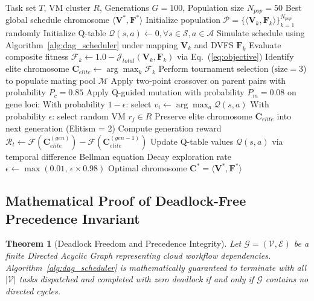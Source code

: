 \documentclass[default,sn-mathphys-num]{sn-jnl}
\theoremstyle{thmstyleone}
\newtheorem{theorem}{Theorem}
\theoremstyle{thmstyletwo}
\theoremstyle{thmstylethree}
\begin{document}
\begin{algorithm}[t]
\caption{Co-Evolutionary RL-GA Multi-Objective Optimization Core}\label{alg:co_evol}
\begin{algorithmic}[1]
\Require Task set $T$, VM cluster $R$, Generations $G=100$, Population size $N_{pop}=50$
\Ensure Best global schedule chromosome $\langle \mathbf{V}^*, \mathbf{F}^* \rangle$
\State Initialize population $\mathcal{P} = \{\langle \mathbf{V}_k, \mathbf{F}_k \rangle\}_{k=1}^{N_{pop}}$ randomly
\State Initialize Q-table $\mathcal{Q}(s, a) \gets 0, \forall s \in \mathcal{S}, a \in \mathcal{A}$
        \State Simulate schedule using Algorithm~\ref{alg:dag_scheduler} under mapping $\mathbf{V}_k$ and DVFS $\mathbf{F}_k$
        \State Evaluate composite fitness $\mathcal{F}_k \gets 1.0 - \mathcal{J}_{total}(\mathbf{V}_k, \mathbf{F}_k)$ via Eq.~(\ref{eq:objective})
    \EndFor
    \State Identify elite chromosome $\mathbf{C}_{elite} \gets \arg\max_k \mathcal{F}_k$
    \State Perform tournament selection ($\text{size} = 3$) to populate mating pool $\mathcal{M}$
    \State Apply two-point crossover on parent pairs with probability $P_c = 0.85$
    \State Apply Q-guided mutation with probability $P_m = 0.08$ on gene loci:
    \State \quad With probability $1-\epsilon$: select $v_i \gets \arg\max_a \mathcal{Q}(s, a)$
    \State \quad With probability $\epsilon$: select random VM $r_j \in R$
    \State Preserve elite chromosome $\mathbf{C}_{elite}$ into next generation (Elitism = 2)
    \State Compute generation reward $\mathcal{R}_t \gets \mathcal{F}(\mathbf{C}_{elite}^{(gen)}) - \mathcal{F}(\mathbf{C}_{elite}^{(gen-1)})$
    \State Update Q-table values $\mathcal{Q}(s, a)$ via temporal difference Bellman equation
    \State Decay exploration rate $\epsilon \gets \max(0.01, \, \epsilon \times 0.98)$
\EndFor
\State \Return Optimal chromosome $\mathbf{C}^* = \langle \mathbf{V}^*, \mathbf{F}^* \rangle$
\end{algorithmic}
\end{algorithm}


\subsection{Mathematical Proof of Deadlock-Free Precedence Invariant}\label{sec:proof}
\begin{theorem}[Deadlock Freedom and Precedence Integrity]
Let $\mathcal{G} = (\mathcal{V}, \mathcal{E})$ be a finite Directed Acyclic Graph representing cloud workflow dependencies. Algorithm~\ref{alg:dag_scheduler} is mathematically guaranteed to terminate with all $|\mathcal{V}|$ tasks dispatched and completed with zero deadlock if and only if $\mathcal{G}$ contains no directed cycles.
\end{theorem}
\end{document}
